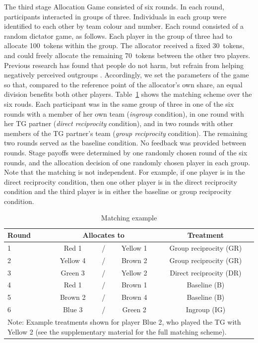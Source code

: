 \documentclass[12pt,a4paper]{article}\usepackage[]{graphicx}\usepackage[]{color}
\begin{document}
The third stage Allocation Game consisted of six rounds. In each round, participants interacted
in groups of three. Individuals in each group were identified to each other by
team colour and number. Each round consisted of a random dictator game, as
follows. Each player in the group of three had to allocate 100~tokens within the
group. The allocator received a fixed 30~tokens, and could freely allocate the
remaining 70~tokens between the other two players. Previous research has found that
people do not harm, but refrain from helping negatively perceived outgroups
\citep{weisel2015ingroup}. Accordingly, we set the parameters of the game so
that, compared to the reference point of the allocator's own share, an equal
division benefits both other players. Table~\ref{tab:example} shows the matching scheme over the six rouds. Each participant was in the same group of three in one of the six rounds with a
member of her own team (\emph{ingroup} condition), in one round with her TG partner
(\emph{direct reciprocity} condition), and in two rounds with other members of the TG
partner's team (\emph{group reciprocity} condition). The remaining two rounds
served as the baseline condition. No feedback was provided between rounds. Stage payoffs were determined by one randomly chosen round of the six rounds, and
the allocation decision of one randomly chosen player in each group. Note that the matching is not independent. For example, if one player is in the direct reciprocity condition, then one other player
is in the direct reciprocity condition and the third player is in either the baseline or group
reciprocity condition. 

\begin{table}
  \caption{Matching example}\label{tab:example}
  \begin{center}
    \begin{tabular}{lcccc}
    \toprule
    Round	&	\multicolumn{3}{c}{Allocates to}		&	Treatment	\\
    \midrule
    1	&	\color{red}Red 1	&	/	&	\color{yellow!80!black}Yellow 1	&	Group reciprocity (GR)	\\
    2	&	\color{yellow!80!black}Yellow 4	&	/	&	\color{brown}Brown 2	&	Group reciprocity (GR)	\\
    3	&	\color{green!60!black}Green 3	&	/	&	\color{yellow!80!black}Yellow 2	&	Direct reciprocity (DR)	\\
    4	&	\color{red}Red 1	&	/	&	\color{brown}Brown 1	&	Baseline (B)	\\
    5	&	\color{brown}Brown 2	&	/	&	\color{brown}Brown 4	&	Baseline (B)	\\
    6	&	\color{blue}Blue 3	&	/	&	\color{green!60!black}Green 2	&	Ingroup (IG)	\\
    \bottomrule
    \multicolumn{5}{p{0.7\textwidth}}{\footnotesize
	Note: Example treatments shown for player {\color{blue}Blue 2}, who played the TG with {\color{yellow!80!black}Yellow 2} (see the supplementary material for the full matching scheme).    
    }
    \end{tabular}
  \end{center}
\end{table}
\end{document}
